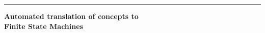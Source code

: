 \documentclass[british]{article}
\newcommand{\lyxline}[1][1pt]{%
  \par\noindent%
  \rule[.5ex]{\linewidth}{#1}\par}
\begin{document}
\lyxline{\normalsize}

\vspace{15mm}

\begin{center}
\textbf{\huge Automated translation of concepts to\\ Finite State Machines}
\par\end{center}{\huge \par}

\begin{center}
\bigskip{}
{\Large \MEMOauthors}
\par\end{center}{\Large \par}

\begin{center}
\texttt{\small \MEMOcontacts}
\par\end{center}{\small \par}

\begin{center}
\bigskip{}
{\large \MEMOnumber}
\par\end{center}{\large \par}

\begin{center}
{\large \MEMOdate}
\par\end{center}{\large \par}

\vspace{15mm}


\newpage{}

\thispagestyle{fancy}










\end{document}
